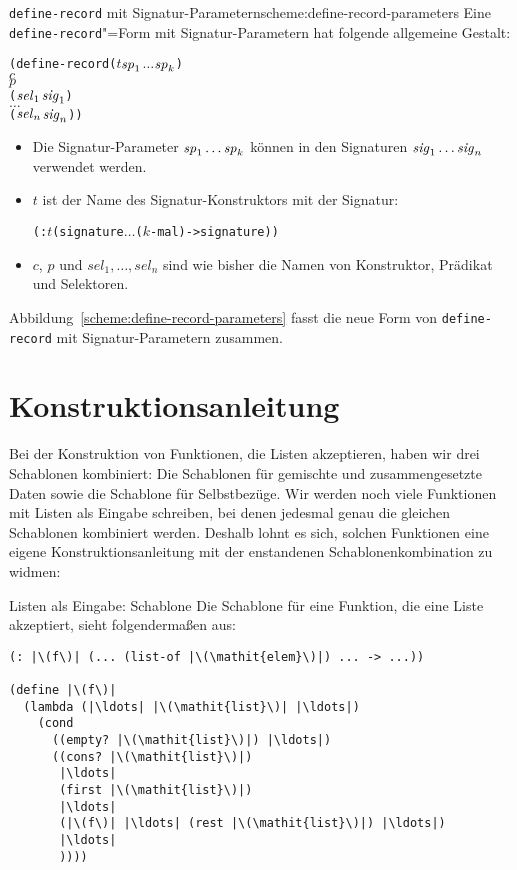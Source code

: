 \begin{feature}{\texttt{define-record} mit Signatur-Parametern}{scheme:define-record-parameters}
Eine \lstinline{define-record}"=Form
mit Signatur-Parametern hat folgende allgemeine Gestalt:\label{def:define-record-parameters}
%
\begin{alltt}
(define-record (\(t\) \(\mathit{sp}\sb{1}\) \(\ldots\) \(\mathit{sp}\sb{k}\))
  \(c\)
  \(p\)
  (\(\mathit{sel}\sb{1}\) \(\mathit{sig}\sb{1}\))
  \(\ldots\)
  (\(\mathit{sel}\sb{n}\) \(\mathit{sig}\sb{n}\)))
\end{alltt}
%
%
\begin{itemize}
\item Die Signatur-Parameter $\mathit{sp}\sb{1} \ldots \mathit{sp}\sb{k}$
können in den Signaturen
\(\mathit{sig}\sb{1}\ldots\mathit{sig}\sb{n}\) verwendet werden.
\item $t$ ist der Name des Signatur-Konstruktors mit der Signatur:
\begin{alltt}
(: \(t\) (signature \(\ldots\) \textrm{(\(k\)-mal)} -> signature))
\end{alltt}
  \item $c$, $p$ und $\mathit{sel}_1, \ldots, \mathit{sel}_n$ sind wie
    bisher die Namen von Konstruktor, Prädikat und Selektoren.
\end{itemize}
%
\end{feature}

Abbildung~\ref{scheme:define-record-parameters} fasst die
neue Form von \lstinline{define-record} mit
Signatur-Parametern zusammen.

\section{Konstruktionsanleitung}

Bei der Konstruktion von Funktionen, die Listen akzeptieren, haben wir
drei Schablonen kombiniert: Die Schablonen für gemischte und
zusammengesetzte Daten sowie die Schablone für Selbstbezüge.  Wir
werden noch viele Funktionen mit Listen als Eingabe schreiben, bei
denen jedesmal genau die gleichen Schablonen kombiniert werden.
Deshalb lohnt es sich, solchen Funktionen eine eigene
Konstruktionsanleitung mit der enstandenen Schablonenkombination zu widmen:

\begin{konstruktionsanleitung}{Listen als Eingabe: Schablone}
  \label{ka:listen-eingabe-schablone}
Die Schablone für eine Funktion, die eine Liste akzeptiert, sieht
folgendermaßen aus:
%
\begin{lstlisting}
(: |\(f\)| (... (list-of |\(\mathit{elem}\)|) ... -> ...))

(define |\(f\)|
  (lambda (|\ldots| |\(\mathit{list}\)| |\ldots|)
    (cond
      ((empty? |\(\mathit{list}\)|) |\ldots|)
      ((cons? |\(\mathit{list}\)|)
       |\ldots|
       (first |\(\mathit{list}\)|)
       |\ldots|
       (|\(f\)| |\ldots| (rest |\(\mathit{list}\)|) |\ldots|)
       |\ldots|
       ))))
\end{lstlisting}
  
  
\end{konstruktionsanleitung}

